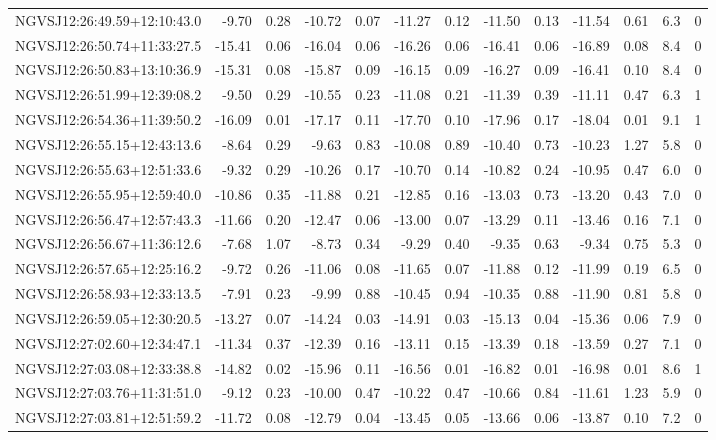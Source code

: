 \begin{tabular}{lrrrrrrrrrrcc}
NGVSJ12:26:49.59+12:10:43.0 & -9.70 & 0.28 & -10.72 & 0.07 & -11.27 & 0.12 & -11.50 & 0.13 & -11.54 & 0.61 & 6.3 & 0 \\
NGVSJ12:26:50.74+11:33:27.5 & -15.41 & 0.06 & -16.04 & 0.06 & -16.26 & 0.06 & -16.41 & 0.06 & -16.89 & 0.08 & 8.4 & 0 \\
NGVSJ12:26:50.83+13:10:36.9 & -15.31 & 0.08 & -15.87 & 0.09 & -16.15 & 0.09 & -16.27 & 0.09 & -16.41 & 0.10 & 8.4 & 0 \\
NGVSJ12:26:51.99+12:39:08.2 & -9.50 & 0.29 & -10.55 & 0.23 & -11.08 & 0.21 & -11.39 & 0.39 & -11.11 & 0.47 & 6.3 & 1 \\
NGVSJ12:26:54.36+11:39:50.2 & -16.09 & 0.01 & -17.17 & 0.11 & -17.70 & 0.10 & -17.96 & 0.17 & -18.04 & 0.01 & 9.1 & 1 \\
NGVSJ12:26:55.15+12:43:13.6 & -8.64 & 0.29 & -9.63 & 0.83 & -10.08 & 0.89 & -10.40 & 0.73 & -10.23 & 1.27 & 5.8 & 0 \\
NGVSJ12:26:55.63+12:51:33.6 & -9.32 & 0.29 & -10.26 & 0.17 & -10.70 & 0.14 & -10.82 & 0.24 & -10.95 & 0.47 & 6.0 & 0 \\
NGVSJ12:26:55.95+12:59:40.0 & -10.86 & 0.35 & -11.88 & 0.21 & -12.85 & 0.16 & -13.03 & 0.73 & -13.20 & 0.43 & 7.0 & 0 \\
NGVSJ12:26:56.47+12:57:43.3 & -11.66 & 0.20 & -12.47 & 0.06 & -13.00 & 0.07 & -13.29 & 0.11 & -13.46 & 0.16 & 7.1 & 0 \\
NGVSJ12:26:56.67+11:36:12.6 & -7.68 & 1.07 & -8.73 & 0.34 & -9.29 & 0.40 & -9.35 & 0.63 & -9.34 & 0.75 & 5.3 & 0 \\
NGVSJ12:26:57.65+12:25:16.2 & -9.72 & 0.26 & -11.06 & 0.08 & -11.65 & 0.07 & -11.88 & 0.12 & -11.99 & 0.19 & 6.5 & 0 \\
NGVSJ12:26:58.93+12:33:13.5 & -7.91 & 0.23 & -9.99 & 0.88 & -10.45 & 0.94 & -10.35 & 0.88 & -11.90 & 0.81 & 5.8 & 0 \\
NGVSJ12:26:59.05+12:30:20.5 & -13.27 & 0.07 & -14.24 & 0.03 & -14.91 & 0.03 & -15.13 & 0.04 & -15.36 & 0.06 & 7.9 & 0 \\
NGVSJ12:27:02.60+12:34:47.1 & -11.34 & 0.37 & -12.39 & 0.16 & -13.11 & 0.15 & -13.39 & 0.18 & -13.59 & 0.27 & 7.1 & 0 \\
NGVSJ12:27:03.08+12:33:38.8 & -14.82 & 0.02 & -15.96 & 0.11 & -16.56 & 0.01 & -16.82 & 0.01 & -16.98 & 0.01 & 8.6 & 1 \\
NGVSJ12:27:03.76+11:31:51.0 & -9.12 & 0.23 & -10.00 & 0.47 & -10.22 & 0.47 & -10.66 & 0.84 & -11.61 & 1.23 & 5.9 & 0 \\
NGVSJ12:27:03.81+12:51:59.2 & -11.72 & 0.08 & -12.79 & 0.04 & -13.45 & 0.05 & -13.66 & 0.06 & -13.87 & 0.10 & 7.2 & 0 \\

\end{tabular}
